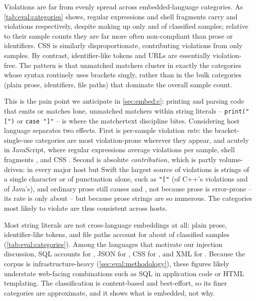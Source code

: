 Violations are far from evenly spread across embedded-language categories.
As \cref{tab:eval:categories} shows,
regular expressions and shell fragments
carry \dataRegexViolations and \dataShellViolations violations respectively,
despite making up only \dataRegexShare and \dataShellShare of classified samples;
relative to their sample counts they are
far more often non-compliant than prose or identifiers.
CSS is similarly disproportionate,
contributing \dataCssViolations violations from only \dataCssSamples samples.
By contrast, identifier-like tokens and URLs
are essentially violation-free.
The pattern is that unmatched matchers cluster
in exactly the categories whose syntax routinely uses brackets singly,
rather than in the bulk categories
(plain prose, identifiers, file paths)
that dominate the overall sample count.

This is the pain point we anticipate
in \cref{sec:embed:c}:
printing and parsing code that emits or matches
lone, unmatched matchers within string literals --
\eg \verb|print("[")| or \verb|case "]"| --
is where the matchertext discipline bites.
Considering host language separates two effects.
First is per-sample violation \emph{rate}:
the bracket-single-use categories are most violation-prone
wherever they appear, and acutely in JavaScript,
where regular expressions average \dataJsRegexRate violations per sample,
shell fragments \dataJsShellRate, and CSS \dataJsCssRate.
Second is absolute \emph{contribution}, which is partly volume-driven:
in every major host but Swift the largest source of violations
is strings of a single character or of punctuation alone, such as \verb|"["|
(\dataCppLoneViolationShare of C++'s violations and \dataJavaLoneViolationShare of Java's),
and ordinary prose still causes \dataCppProseViolationShare and \dataJavaProseViolationShare,
not because prose is error-prone --
its rate is only about \dataProseRate{} --
but because prose strings are so numerous.
The categories most likely to violate
are thus consistent across hosts.

Most string literals are not cross-language embeddings at all:
plain prose, identifier-like tokens, and file paths
account for about \dataBulkShare of classified samples (\cref{tab:eval:categories}).
Among the languages that motivate our injection discussion,
SQL accounts for \dataSqlShare, JSON for \dataJsonShare,
CSS for \dataCssShare, and XML for \dataXmlShare.
Because the corpus is infrastructure-heavy (\cref{sec:eval:methodology}),
these figures likely understate web-facing combinations
such as SQL in application code or HTML templating.
The classification is content-based and best-effort,
so its finer categories are approximate,
and it shows what is embedded, not why.

